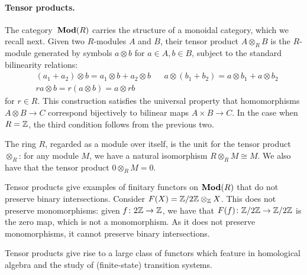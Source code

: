 \documentclass[runningheads]{llncs}
\begin{document}
\paragraph*{Tensor products.}
The category~$\operatorname{\mathbf{Mod}}(R)$ carries the structure of a monoidal category, which we recall next.
Given two $R$-modules $A$ and $B$, their tensor product $A \otimes_{R} B$ is the $R$-module generated by symbols $a \otimes b$ for $a \in A, b \in B$, subject to the standard bilinearity relations:
\begin{align*}
&(a_1 + a_2) \otimes b = a_1 \otimes b + a_2 \otimes b && a \otimes (b_1 + b_2) = a \otimes b_1 + a \otimes b_2  \\
&ra \otimes  b = r(a\otimes b)= a\otimes rb
\end{align*}
for $r\in R$. This construction satisfies the universal property that homomorphisms $A \otimes B \to C$ correspond bijectively to bilinear maps $A \times B \to C$.
In the case when $R = \mathbb{Z}$, the third condition follows from the previous two.
\begin{example}
    The ring $R$, regarded as a module over itself, is the unit for the tensor product $\otimes_R$: for any module  $M$, we have a natural isomorphism $R \otimes_R M \cong M$. We also have that the tensor product $0 \otimes_R M = 0$.
\end{example}
\begin{example}
Tensor products give examples of finitary functors on $\operatorname{\mathbf{Mod}}(R)$ that do not preserve binary intersections. Consider $F(X) = \mathbb{Z}/2\mathbb{Z} \otimes_{\mathbb{Z}} X$. This does not preserve monomorphisms: given $f \colon 2\mathbb{Z}\to \mathbb{Z}$, we have that $F(f)\colon \mathbb{Z}/2\mathbb{Z}\to \mathbb{Z}/2\mathbb{Z}$ is the zero map, which is not a monomorphism. As it does not preserve monomorphisms, it cannot preserve binary intersections.
\end{example}
Tensor products give rise to a large class of functors which feature in homological algebra and the study of (finite-state) transition systems.
\end{document}
